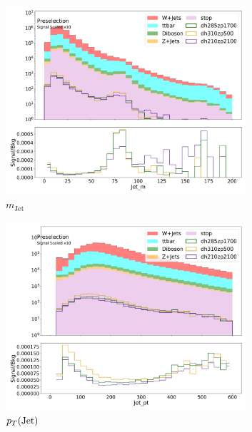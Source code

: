   \begin{figure}[htbp]
    \centering
      \begin{subfigure}{0.49\textwidth}
      \includegraphics[width = 0.98\textwidth]{Figures/appendix/Preselection/Jet_m.png}
      \caption{\ensuremath{m_{\text{Jet}}}}
      \end{subfigure}
      \begin{subfigure}{0.49\textwidth}
      \includegraphics[width = 0.98\textwidth]{Figures/appendix/Preselection/Jet_pt.png}
      \caption{\ensuremath{\pT(\text{Jet})}}
      \end{subfigure}
      \begin{subfigure}{0.49\textwidth}

\end{subfigure}
\end{figure}

